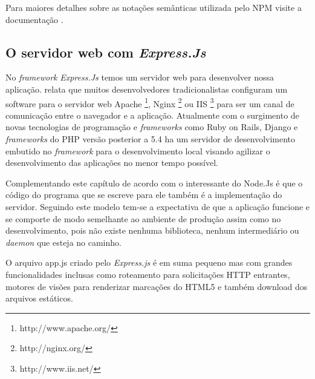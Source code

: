   Para maiores detalhes sobre as notações semânticas utilizada pelo \ac{NPM} visite a documentação \cite{Semver:2013}.

\subsection{O servidor web com \textit{Express.Js}}
\label{servidor-web-express-js}

  No \textit{framework} \textit{Express.Js} temos um servidor web para desenvolver nossa aplicação. 
  \cite{Wilson:2013} relata que muitos desenvolvedores tradicionalistas configuram um software para o servidor web Apache \footnote{http://www.apache.org/},
  Nginx \footnote{http://nginx.org/} ou IIS \footnote{http://www.iis.net/} para ser um canal de comunicação entre o 
  navegador e a aplicação.
  Atualmente com o surgimento de novas tecnologias de programação e \textit{frameworks} como Ruby on Rails, 
  Django e \textit{frameworks} do \ac{PHP} versão posterior a 5.4 ha um servidor de desenvolvimento embutido no \textit{framework}
  para o desenvolvimento local visando agilizar o desenvolvimento das aplicações no menor tempo possível.
  
  Complementando este capítulo de acordo com \cite{Wilson:2013} o interessante do Node.Js é que o código do 
  programa que se escreve para ele também é a implementação do servidor. 
  Seguindo este modelo tem-se a expectativa de que a aplicação funcione e se comporte de modo semelhante 
  ao ambiente de produção assim como no desenvolvimento, pois não existe nenhuma biblioteca, nenhum intermediário 
  ou \textit{daemon} que esteja no caminho.
  
  O arquivo app.js criado pelo \textit{Express.js} é em suma pequeno mas com grandes funcionalidades inclusas como 
  roteamento para solicitações \ac{HTTP} entrantes, motores de visões para renderizar marcações do HTML5
  e também download dos arquivos estáticos.